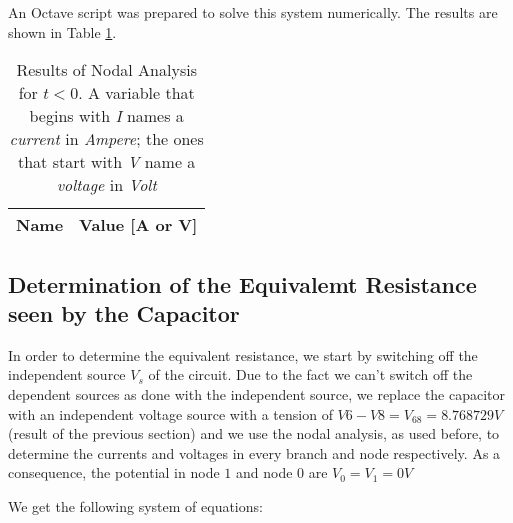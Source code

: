 \hfill


An Octave script was prepared to solve this system numerically. The results are shown in Table \ref{tab:op_tabNodal2}.


\begin{table}[b]
  \centering
  \begin{tabular}{|c|c|}
    \hline
    {\bf Name} & {\bf Value [A or V]} \\ \hline
    
  \end{tabular}
  \caption{Results of Nodal Analysis for $t < 0$. A variable that begins  with \textit{I} names a \textit{current} in \textit{Ampere}; the ones that start with \textit{V} name a \textit{voltage} in \textit{Volt} }
  \label{tab:op_tabNodal2}
\end{table}



\subsection{Determination of the Equivalemt Resistance seen by the Capacitor}

In order to determine the equivalent resistance, we start by switching off the independent source $V_s$ of the circuit. Due to the fact we can't switch off the dependent sources
as done with the independent source, we replace the capacitor with an independent voltage source with a tension of $V6-V8 = V_{68} = 8.768729 V$ (result of the previous section) and we use the nodal analysis, as used before,
to determine the currents and voltages in every branch and node respectively. As a consequence, the potential in node $1$ and node $0$ are $V_0 = V_1 = 0 V$

We get the following system of equations:

